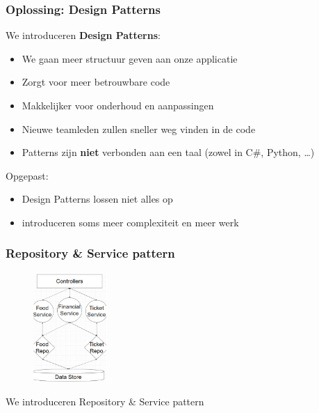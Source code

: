 \documentclass{article}
\begin{document}
\subsubsection{Oplossing: Design Patterns}

We introduceren \textbf{Design Patterns}:

\begin{itemize}
    \item We gaan meer structuur geven aan onze applicatie
    \item Zorgt voor meer betrouwbare code
    \item Makkelijker voor onderhoud en aanpassingen
    \item Nieuwe teamleden zullen sneller weg vinden in de code
    \item Patterns zijn \textbf{niet} verbonden aan een taal (zowel in C\#, Python, \dots)
\end{itemize}

Opgepast:

\begin{itemize}
    \item Design Patterns lossen niet alles op
    \item introduceren soms meer complexiteit en meer werk
\end{itemize}

\subsubsection{Repository \& Service pattern}

\begin{figure}[H]
    \centering
    \includegraphics[width=0.25\textwidth]{repository-service-pattern.png}
    \caption{}
\end{figure}

We introduceren Repository \& Service pattern
\end{document}
